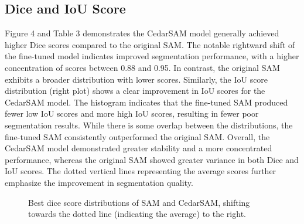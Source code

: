 \documentclass[letterpaper, 10 pt, conference]{ieeeconf}  %
\begin{document}
\subsection{Dice and IoU Score}
Figure 4 and Table 3 demonstrates the CedarSAM model generally achieved higher Dice scores compared to the original SAM. The notable rightward shift of the fine-tuned model indicates improved segmentation performance, with a higher concentration of scores between 0.88 and 0.95. In contrast, the original SAM exhibits a broader distribution with lower scores. Similarly, the IoU score distribution (right plot) shows a clear improvement in IoU scores for the CedarSAM model. The histogram indicates that the fine-tuned SAM produced fewer low IoU scores and more high IoU scores, resulting in fewer poor segmentation results. While there is some overlap between the distributions, the fine-tuned SAM consistently outperformed the original SAM. Overall, the CedarSAM model demonstrated greater stability and a more concentrated performance, whereas the original SAM showed greater variance in both Dice and IoU scores. The dotted vertical lines representing the average scores further emphasize the improvement in segmentation quality.

\begin{figure}[thpb]
  \centering
  \caption{Best dice score distributions of SAM and CedarSAM, shifting towards the dotted line (indicating the average) to the right.}
  \label{fig:score_distributions}
\end{figure}
\end{document}
